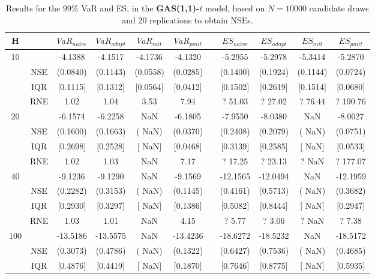 \footnotesize{  
{ \renewcommand{\arraystretch}{1.3} 
\begin{longtable}{ccccccccccc}  
\caption{Results for the $99\%$ VaR and ES, in the \textbf{GAS(1,1)-$t$} model, based on $N=10000$ candidate draws and $20$ replications to obtain NSEs.} 
\label{tab:res_algos_t_gas} \\ 
 H & & $VaR_{naive}$ & $VaR_{adapt}$ & $VaR_{mit}$  & $VaR_{pmit}$ &  & $ES_{naive}$ & $ES_{adapt}$ & $ES_{mit}$ & $ES_{pmit}$ \\ \hline 
10 & & -4.1388 & -4.1517 & -4.1736 & -4.1320 & & -5.2955 & -5.2978 & -5.3414 & -5.2870  \\ 
  & NSE & (0.0840) & (0.1143) & (0.0558) & (0.0285) & & (0.1400) & (0.1924) & (0.1144) & (0.0724)   \\ 
 & IQR & $[$0.1115$]$ & $[$0.1312$]$ & $[$0.0564$]$ & $[$0.0412$]$ & & $[$0.1502$]$ & $[$0.2619$]$  &$[$0.1514$]$ & $[$0.0680$]$  \\  
  & RNE &   1.02 &   1.04 &   3.53 &   7.94 &  &?  51.03 & ?  27.02 &  ?  76.44 & ? 190.76   \\ [1ex] 
20 & & -6.1574 & -6.2258 &    NaN & -6.1805 & & -7.9550 & -8.0380 &    NaN & -8.0027  \\ 
  & NSE & (0.1600) & (0.1663) & (   NaN) & (0.0370) & & (0.2408) & (0.2079) & (   NaN) & (0.0751)   \\ 
 & IQR & $[$0.2698$]$ & $[$0.2528$]$ & $[$   NaN$]$ & $[$0.0468$]$ & & $[$0.3139$]$ & $[$0.2585$]$  &$[$   NaN$]$ & $[$0.0533$]$  \\  
  & RNE &   1.02 &   1.03 &    NaN &   7.17 &  &?  17.25 & ?  23.13 &  ?    NaN & ? 177.07   \\ [1ex] 
40 & & -9.1236 & -9.1290 &    NaN & -9.1569 & & -12.1565 & -12.0494 &    NaN & -12.1959  \\ 
  & NSE & (0.2282) & (0.3153) & (   NaN) & (0.1145) & & (0.4161) & (0.5713) & (   NaN) & (0.3682)   \\ 
 & IQR & $[$0.2930$]$ & $[$0.3297$]$ & $[$   NaN$]$ & $[$0.1386$]$ & & $[$0.5082$]$ & $[$0.8444$]$  &$[$   NaN$]$ & $[$0.2947$]$  \\  
  & RNE &   1.03 &   1.01 &    NaN &   4.15 &  &?   5.77 & ?   3.06 &  ?    NaN & ?   7.38   \\ [1ex] 
100 & & -13.5186 & -13.5575 &    NaN & -13.4236 & & -18.6272 & -18.5232 &    NaN & -18.5172  \\ 
  & NSE & (0.3073) & (0.4786) & (   NaN) & (0.1322) & & (0.6427) & (0.7536) & (   NaN) & (0.4685)   \\ 
 & IQR & $[$0.4876$]$ & $[$0.4419$]$ & $[$   NaN$]$ & $[$0.1870$]$ & & $[$0.7646$]$ & $[$0.8775$]$  &$[$   NaN$]$ & $[$0.5935$]$  \\  

\end{longtable}}}
